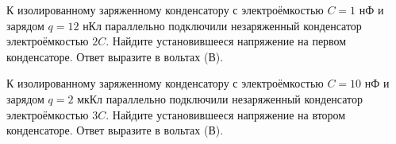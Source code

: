\begin{taskbasic}[code={\label{task:elem_cap_charge_redistribution_1}}]
К изолированному заряженному конденсатору с электроёмкостью $C = 1\text{ нФ}$ и зарядом $q = 12\text{ нКл}$ параллельно подключили незаряженный конденсатор электроёмкостью $2C$. Найдите установившееся напряжение на первом конденсаторе. Ответ выразите в вольтах (В).

\end{taskbasic}

\begin{taskbasic}[code={\label{task:elem_cap_charge_redistribution_2}}]
К изолированному заряженному конденсатору с электроёмкостью $C = 10\text{ нФ}$ и зарядом $q = 2\text{ мкКл}$ параллельно подключили незаряженный конденсатор электроёмкостью $3C$. Найдите установившееся напряжение на втором конденсаторе. Ответ выразите в вольтах (В).

\end{taskbasic}

